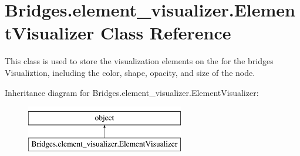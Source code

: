 \hypertarget{class_bridges_1_1element__visualizer_1_1_element_visualizer}{}\section{Bridges.\+element\+\_\+visualizer.\+Element\+Visualizer Class Reference}
\label{class_bridges_1_1element__visualizer_1_1_element_visualizer}


This class is used to store the visualization elements on the for the bridges Visualiztion, including the color, shape, opacity, and size of the node.  


Inheritance diagram for Bridges.\+element\+\_\+visualizer.\+Element\+Visualizer\+:\begin{figure}[H]
\begin{center}
\leavevmode
\includegraphics[height=2.000000cm]{class_bridges_1_1element__visualizer_1_1_element_visualizer}
\end{center}
\end{figure}
